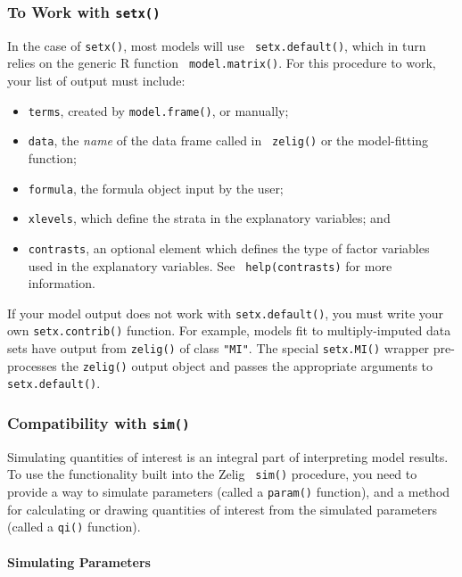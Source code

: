 \subsubsection{To Work with {\tt setx()}}

In the case of {\tt setx()}, most models will use {\tt
  setx.default()}, which in turn relies on the generic R function {\tt
  model.matrix()}.  For this procedure to work, your list of output
must include:  
\begin{itemize}
\item {\tt terms}, created by {\tt model.frame()}, or manually;
\item {\tt data}, the \emph{name} of the data frame called in {\tt
    zelig()} or the model-fitting function;
\item {\tt formula}, the formula object input by the user;
\item {\tt xlevels}, which define the strata in the explanatory
  variables; and
\item {\tt contrasts}, an optional element which defines the type of
  factor variables used in the explanatory variables.  See {\tt
    help(contrasts)} for more information.
\end{itemize}

If your model output does not work with {\tt setx.default()}, you must
write your own {\tt setx.contrib()} function.  For example, models fit
to multiply-imputed data sets have output from {\tt zelig()} of class
{\tt "MI"}.  The special {\tt setx.MI()} wrapper pre-processes the
{\tt zelig()} output object and passes the appropriate arguments to
{\tt setx.default()}.  

\subsubsection{Compatibility with {\tt sim()}}

Simulating quantities of interest is an integral part of interpreting
model results.  To use the functionality built into the Zelig {\tt
sim()} procedure, you need to provide a way to simulate parameters
(called a {\tt param()} function), and a method for calculating or
drawing quantities of interest from the simulated parameters (called a
{\tt qi()} function).

\paragraph{Simulating Parameters}

